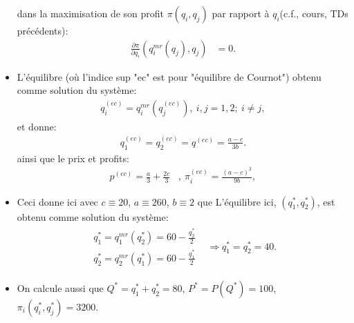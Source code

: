 \begin{frame}[allowframebreaks]{\insertsection}
\begin{itemize}
    dans la maximisation de son profit $\pi(q_i, q_j)$ par rapport à $q_i$(c.f., cours, TDs précédents): 
    \begin{align*}
        \frac{\partial \pi}{\partial q_i}\left(q_i^{mr}(q_j), q_j\right)&=0.
    \end{align*}
       \item L'équilibre  (où l'indice sup "ec" est pour "équilibre de Cournot") obtenu comme solution du système:
       \begin{align*}
       q_i^{(ec)} =  q_i^{mr}(q_j^{(ec)}),  \ i, j = 1, 2; \ i\neq j,
       \end{align*}
       et donne:
      \begin{align*}
    q_1^{(ec)} = q_2^{(ec)} = q^{(ec)} = \frac{a-c}{3b}.
      \end{align*}
      ainsi que le prix et profits:
      \begin{align*}
      p^{(ec)} = \frac{a}{3} +\frac{2c}{3}&, \  \pi_i^{(ec)} = \frac{(a-c)^2}{9b},
      \end{align*}
       \item Ceci donne ici avec  $c \equiv 20$,  $a \equiv 260$,  $b \equiv 2$ que L'équilibre ici,
        $(q_1^*, q_2^*)$, est obtenu comme solution du système: 
        \begin{align*}
            \begin{array}{l}
            q_1^* = q_1^{mr}(q_2^*) = 60 - \frac{q_2^*}{2}\\
            q_2^* = q_2^{mr}(q_1^*) = 60 - \frac{q_1^*}{2}
            \end{array}
            &\Rightarrow q_1^* = q_2^* = 40.
        \end{align*}
    \item On calcule aussi que $Q^* = q_1^* + q_2^* = 80$, $P^*=P(Q^*) = 100$,  $\pi_i(q_i^*, q_j^*) = 3200$.
\end{itemize}
\end{frame}

